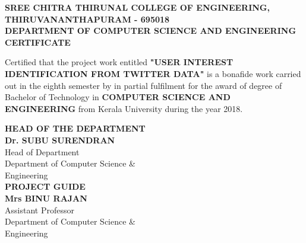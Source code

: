 \begin{center}
	\textbf{{\large SREE CHITRA THIRUNAL COLLEGE OF ENGINEERING,}}\\
	\textbf{{\large THIRUVANANTHAPURAM - 695018}}\\
	\textbf{{DEPARTMENT OF COMPUTER SCIENCE AND ENGINEERING}}\\
	[\baselineskip]
	\logo
	[\baselineskip]
	\textbf{
		{\Large CERTIFICATE}
	}\\
	[\baselineskip]
\end{center}
\par
	Certified that the project work entitled \textbf{"USER INTEREST IDENTIFICATION FROM TWITTER DATA"} is a bonafide work carried 
	out in the eighth semester by \name in partial fulfilment for the 
	award of degree of Bachelor of Technology in \textbf{COMPUTER SCIENCE AND ENGINEERING} 
	from Kerala University during the year 2018.

\vspace{1.5in}
\setlength{\columnsep}{1cm}
\begin{multicols}{2}

\noindent
\textbf{HEAD OF THE DEPARTMENT}\\
\textbf{Dr. SUBU SURENDRAN}\\
Head of Department\\
Department of Computer Science \& \\
Engineering\\
\vfill
\noindent
\textbf{PROJECT GUIDE}\\
\textbf{Mrs BINU RAJAN}\\
Assistant Professor\\
Department of Computer Science \&\\
Engineering\\
\vfill
\end{multicols}	

